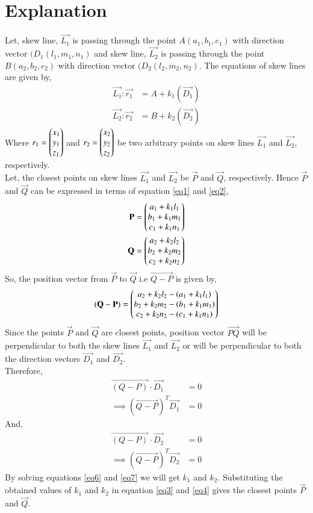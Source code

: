 \documentclass[journal,12pt,twocolumn]{IEEEtran}
\begin{document}
\section{Explanation}
Let, skew line, $\vec{L_1}$ is passing through the point $A(a_1,b_1,c_1)$ with direction vector $(D_1(l_1,m_1,n_1)$ and skew line, $\vec{L_2}$ is passing through the point $B(a_2,b_2,c_2)$  with direction vector $(D_2(l_2,m_2,n_2)$. The equations of skew lines are given by,
\begin{align}
\vec{L_1}: \vec{r_1}&=A+k_1(\vec{D_1})\label{eq1}\\
\vec{L_2}: \vec{r_2}&=B+k_2(\vec{D_2})\label{eq2}
\end{align}
Where $r_1=\begin{pmatrix}x_1\\y_1\\z_1\end{pmatrix}$ and $r_2=\begin{pmatrix}x_2\\ y_2\\z_2\end{pmatrix}$ be two arbitrary points on skew lines $\vec{L_1}$ and $\vec{L_2}$, respectively. \\
Let, the closest points on skew lines $\vec{L_1}$ and $\vec{L_2}$ be $\vec{P}$ and $\vec{Q}$, respectively. Hence $\vec{P}$ and $\vec{Q}$ can be expressed in terms of equation \eqref{eq1} and \eqref{eq2},
\begin{align}
\mathbf{P}=\begin{pmatrix}a_1+k_1l_1\\b_1+k_1m_1\\c_1+k_1n_1\end{pmatrix}\label{eq3}\\
\mathbf{Q}=\begin{pmatrix}a_2+k_2l_2\\b_2+k_2m_2\\c_2+k_2n_2\end{pmatrix}\label{eq4}
\end{align}
So, the position vector from $\vec{P}$ to $\vec{Q}$ i.e $\vec{Q-P}$ is given by, 
\begin{align}
\mathbf{(Q-P)}=\begin{pmatrix}a_2+k_2l_2-(a_1+k_1l_1)\\b_2+k_2m_2-(b_1+k_1m_1)\\
c_2+k_2n_2-(c_1+k_1n_1)\end{pmatrix}\label{eq5}
\end{align}
Since the points $\vec{P}$ and $\vec{Q}$ are closest points, position vector $\vec{PQ}$ will be perpendicular to both the skew lines $\vec{L_1}$ and $\vec{L_2}$ or will be perpendicular to both the direction vectors $\vec{D_1}$ and $\vec{D_2}$.\\ 
Therefore,
\begin{align}
\vec{(Q-P)}\cdot\vec{D_1}&=0\\
\implies(\vec{Q-P})^T\vec{D_1}&=0\label{eq6}
\end{align}
And,
\begin{align}
\vec{(Q-P)}\cdot\vec{D_2}&=0\\
\implies(\vec{Q-P})^T\vec{D_2}&=0\label{eq7}
\end{align}
By solving equations \ref{eq6} and \ref{eq7} we will get $k_1$ and $k_2$. Substituting the obtained values of $k_1$ and $k_2$ in equation \ref{eq3} and \ref{eq4} gives the closest points $\vec{P}$ and $\vec{Q}$.
\end{document}
